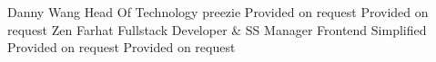 
\begin{referees}
		{Danny Wang}
		{Head Of Technology}
		{preezie}
		{Provided on request}
		{Provided on request}
		{Zen Farhat}
		{Fullstack Developer \& SS Manager}
		{Frontend Simplified}
		{Provided on request}
		{Provided on request}
\end{referees}